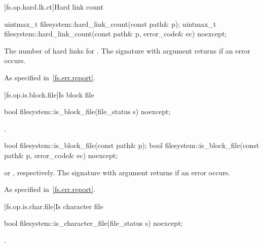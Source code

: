 [fs.op.hard.lk.ct]{Hard link count}

%
\begin{itemdecl}
uintmax_t filesystem::hard_link_count(const path& p);
uintmax_t filesystem::hard_link_count(const path& p, error_code& ec) noexcept;
\end{itemdecl}

\begin{itemdescr}
\pnum
\returns
The number of hard links for . The signature
  with argument  returns 
  if an error occurs.

\pnum
\throws
As specified in~\ref{fs.err.report}.
\end{itemdescr}


[fs.op.is.block.file]{Is block file}

%
\begin{itemdecl}
bool filesystem::is_block_file(file_status s) noexcept;
\end{itemdecl}

\begin{itemdescr}
\pnum
\returns
{}.
\end{itemdescr}

%
\begin{itemdecl}
bool filesystem::is_block_file(const path& p);
bool filesystem::is_block_file(const path& p, error_code& ec) noexcept;
\end{itemdecl}

\begin{itemdescr}
\pnum
\returns
{} or , respectively.
The signature with argument  returns  if an error occurs.

\pnum
\throws
As specified in~\ref{fs.err.report}.
\end{itemdescr}


[fs.op.is.char.file]{Is character file}

%
\begin{itemdecl}
bool filesystem::is_character_file(file_status s) noexcept;
\end{itemdecl}

\begin{itemdescr}
\pnum
\returns
{}.
\end{itemdescr}

